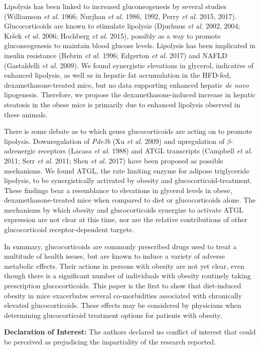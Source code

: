 \documentclass[11pt]{article} %
\begin{document}
Lipolysis has been linked to increased gluconeogenesis by several
studies (Williamson \emph{et al.} 1966; Nurjhan \emph{et al.} 1986,
1992, Perry \emph{et al.} 2015, 2017). Glucocorticoids are known to
stimulate lipolysis (Djurhuus \emph{et al.} 2002, 2004; Kršek \emph{et
al.} 2006; Hochberg \emph{et al.} 2015), possibly as a way to promote
gluconeogenesis to maintain blood glucose levels. Lipolysis has been
implicated in insulin resistance (Rebrin \emph{et al.} 1996; Edgerton
\emph{et al.} 2017) and NAFLD (Gastaldelli \emph{et al.} 2009). We found
synergistic elevations in glycerol, indicative of enhanced lipolysis, as
well as in hepatic fat accumulation in the HFD-fed,
dexamethasone-treated mice, but no data supporting enhanced hepatic
\emph{de novo} lipogenesis. Therefore, we propose the
dexamethasone-induced increase in hepatic steatosis in the obese mice is
primarily due to enhanced lipolysis observed in these animals.

There is some debate as to which genes glucocorticoids are acting on to
promote lipolysis. Downregulation of \emph{Pde3b} (Xu \emph{et al.}
2009) and upregulation of $\beta$-adrenergic receptors (Lacasa \emph{et al.}
1988) and ATGL transcripts (Campbell \emph{et al.} 2011; Serr \emph{et
al.} 2011; Shen \emph{et al.} 2017) have been proposed as possible
mechanisms. We found ATGL, the rate limiting enzyme for adipose
triglyceride lipolysis, to be synergistically activated by obesity and
glucocorticoid-treatment. These findings bear a resemblance to
elevations in glycerol levels in obese, dexamethasone-treated mice when
compared to diet or glucocorticoids alone. The mechanisms by which
obesity and glucocorticoids synergize to activate ATGL expression are
not clear at this time, nor are the relative contributions of other
glucocorticoid receptor-dependent targets.

In summary, glucocorticoids are commonly prescribed drugs used to treat
a multitude of health issues, but are known to induce a variety of
adverse metabolic effects. Their actions in persons with obesity are not
yet clear, even though there is a significant number of individuals with
obesity routinely taking prescription glucocorticoids. This paper is the
first to show that diet-induced obesity in mice exacerbates several
co-morbidities associated with chronically elevated glucocorticoids.
These effects may be considered by physicians when determining
glucocorticoid treatment options for patients with obesity.

\textbf{Declaration of Interest:} The authors declared no conflict of
interest that could be perceived as prejudicing the impartiality of the
research reported.
\end{document}
